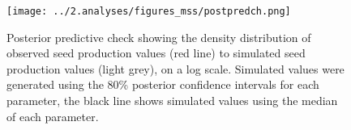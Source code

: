 \documentclass[a4,12pt]{article}
\begin{document}


    \begin{figure}[H]
        \texttt{[image: ../2.analyses/figures\_mss/postpredch.png]}
        \caption{Posterior predictive check showing the density distribution of observed seed production values (red line) to simulated seed production values (light grey), on a log scale. Simulated values were generated using the 80\% posterior confidence intervals for each parameter, the black line shows simulated values using the median of each parameter. }
        \label{fig:ppcheck}
    \end{figure}
  

    

\end{document}
